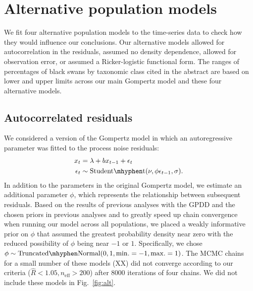 

\section{Alternative population models}

We fit four alternative population models to the time-series data to check how they would influence our conclusions. Our alternative models allowed for autocorrelation in the residuals, assumed no density dependence, allowed for observation error, or assumed a Ricker-logistic functional form. The ranges of percentages of black swans by taxonomic class cited in the abstract are based on lower and upper limits across our main Gompertz model and these four alternative models.

\subsection{Autocorrelated residuals}

We considered a version of the Gompertz model in which an autoregressive parameter was fitted to the process noise residuals: 
\begin{align*}
x_t &= \lambda + b x_{t-1} + \epsilon_t\\
\epsilon_t &\sim \mathrm{Student\mhyphen t}(\nu, \phi \epsilon_{t-1}, \sigma).
\end{align*}
In addition to the parameters in the original Gompertz model, we estimate an additional parameter $\phi$, which represents the relationship between subsequent residuals. Based on the results of previous analyses with the GPDD \citep[e.g.][]{connors2014} and the chosen priors in previous analyses \citep[e.g.][]{thorson2014a} and to greatly speed up chain convergence when running our model across all populations, we placed a weakly informative prior on $\phi$ that assumed the greatest probability density near zero with the reduced possibility of $\phi$ being near $-1$ or $1$. Specifically, we chose $\phi \sim \mathrm{Truncated\mhyphen Normal}(0, 1, \mathrm{min.} = -1, \mathrm{max.} = 1)$. The MCMC chains for a small number of these models (XX) did not converge according to our criteria ($\widehat{R} < 1.05, n_\mathrm{eff} > 200$) after 8000 iterations of four chains. We did not include these models in Fig.~\ref{fig:alt}.

